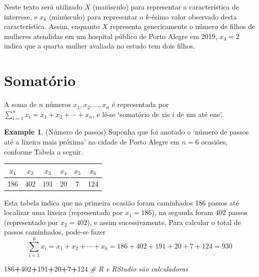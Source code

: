 \documentclass[
]{book}
\newenvironment{Shaded}{\begin{snugshade}}{\end{snugshade}}
\newcommand{\CommentTok}[1]{\textcolor[rgb]{0.56,0.35,0.01}{\textit{#1}}}
\newcommand{\DecValTok}[1]{\textcolor[rgb]{0.00,0.00,0.81}{#1}}
\newcommand{\OperatorTok}[1]{\textcolor[rgb]{0.81,0.36,0.00}{\textbf{#1}}}
\theoremstyle{definition}
\theoremstyle{definition}
\newtheorem{example}{Example}[chapter]
\theoremstyle{definition}
\theoremstyle{remark}
\begin{document}
Neste texto será utilizado \(X\) (maiúsculo) para representar a característica de interesse, e \(x_k\) (minúsculo) para representar o \(k\)-ésimo valor observado desta característica. Assim, enquanto \(X\) representa genericamente o número de filhos de mulheres atendidas em um hospital público de Porto Alegre em 2019, \(x_4 = 2\) indica que a quarta mulher avaliada no estudo tem dois filhos.

\hypertarget{somatorio}{%
\section{Somatório}\label{somatorio}}

A soma de \(n\) números \(x_1, x_2, ..., x_n\) é representada por \(\sum_{i=1}^n {x_i} = x_1 + x_2 + \dotsb + x_n\), e lê-se `somatório de xis \(i\) de um até ene'.

\begin{example}
\protect\hypertarget{exm:somatorio}{}{\label{exm:somatorio} }(Número de passos) Suponha que foi anotado o `número de passos até a lixeira mais próxima' na cidade de Porto Alegre em \(n = 6\) ocasiões, conforme Tabela a seguir.

\begin{longtable}[]{@{}cccccc@{}}
\toprule
\(x_{1}\) & \(x_{2}\) & \(x_{3}\) & \(x_{4}\) & \(x_{5}\) & \(x_{6}\)\tabularnewline
\midrule
\endhead
186 & 402 & 191 & 20 & 7 & 124\tabularnewline
\bottomrule
\end{longtable}

Esta tabela indica que na primeira ocasião foram caminhados 186 passos até localizar uma lixeira (representado por \(x_1=186\)), na segunda foram 402 passos (representado por \(x_2=402\)), e assim sucessivamente. Para calcular o total de passos caminhados, pode-se fazer
\begin{equation}
\sum_{i=1}^6 {x_i} = x_1 + x_2 + \dotsb + x_6 = 186+402+191+20+7+124 = 930
\label{eq:somatorio}
\end{equation}
\end{example}

\begin{Shaded}
\begin{Highlighting}[]
\DecValTok{186}\OperatorTok{+}\DecValTok{402}\OperatorTok{+}\DecValTok{191}\OperatorTok{+}\DecValTok{20}\OperatorTok{+}\DecValTok{7}\OperatorTok{+}\DecValTok{124}            \CommentTok{\# R e RStudio são calculadoras}
\end{Highlighting}
\end{Shaded}
\end{document}
